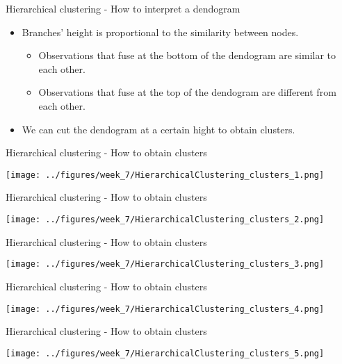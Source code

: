 \documentclass[notes]{beamer}          %
\begin{document}
\begin{frame}{Hierarchical clustering - How to interpret a dendogram}
\begin{itemize}
\item Branches' height is proportional to the similarity between nodes.
\begin{itemize}
\item Observations that fuse at the bottom of the dendogram are similar to each other.
\item Observations that fuse at the top of the dendogram are different from each other.
\end{itemize}
\item We can cut the dendogram at a certain hight to obtain clusters.
\end{itemize}
\end{frame}

\begin{frame}{Hierarchical clustering - How to obtain clusters}
\begin{center}
\texttt{[image: ../figures/week\_7/HierarchicalClustering\_clusters\_1.png]}  
\end{center}
\end{frame}

\begin{frame}{Hierarchical clustering - How to obtain clusters}
\begin{center}
\texttt{[image: ../figures/week\_7/HierarchicalClustering\_clusters\_2.png]}  
\end{center}
\end{frame}

\begin{frame}{Hierarchical clustering - How to obtain clusters}
\begin{center}
\texttt{[image: ../figures/week\_7/HierarchicalClustering\_clusters\_3.png]}  
\end{center}
\end{frame}

\begin{frame}{Hierarchical clustering - How to obtain clusters}
\begin{center}
\texttt{[image: ../figures/week\_7/HierarchicalClustering\_clusters\_4.png]}  
\end{center}
\end{frame}

\begin{frame}{Hierarchical clustering - How to obtain clusters}
\begin{center}
\texttt{[image: ../figures/week\_7/HierarchicalClustering\_clusters\_5.png]}  
\end{center}
\end{frame}
\end{document}
